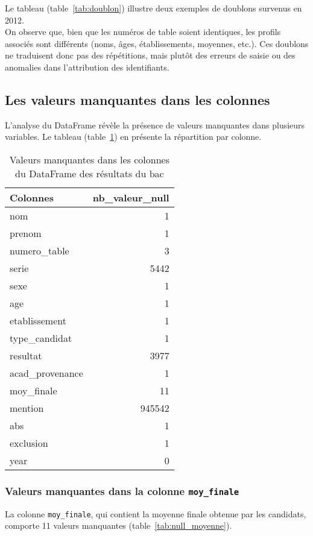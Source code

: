 Le tableau (table~\ref{tab:doublon}) illustre deux exemples de doublons survenus en 2012.\\
On observe que, bien que les numéros de table soient identiques, les profils associés sont différents (noms, âges, établissements, moyennes, etc.).
Ces doublons ne traduisent donc pas des répétitions, mais plutôt des erreurs de saisie ou des anomalies dans l’attribution des identifiants.

\subsection{Les valeurs manquantes dans les colonnes}

L’analyse du DataFrame révèle la présence de valeurs manquantes dans plusieurs variables. Le tableau (table~\ref{tab:valeurs_nulles}) en présente la répartition par colonne.

\begin{table}[ht]
\centering
\caption{Valeurs manquantes dans les colonnes du DataFrame des résultats du bac}
\label{tab:valeurs_nulles}
\begin{tabular}{lr}
\toprule
Colonnes & nb\_valeur\_null \\
\midrule
nom & 1 \\
prenom & 1 \\
numero\_table & 3 \\
serie & 5442 \\
sexe & 1 \\
age & 1 \\
etablissement & 1 \\
type\_candidat & 1 \\
resultat & 3977 \\
acad\_provenance & 1 \\
moy\_finale & 11 \\
mention & 945542 \\
abs & 1 \\
exclusion & 1 \\
year & 0 \\
\bottomrule
\end{tabular}
\end{table}

\subsubsection{Valeurs manquantes dans la colonne \texttt{moy\_finale}}

La colonne \texttt{moy\_finale}, qui contient la moyenne finale obtenue par les candidats, comporte 11 valeurs manquantes (table~\ref{tab:null_moyenne}).

